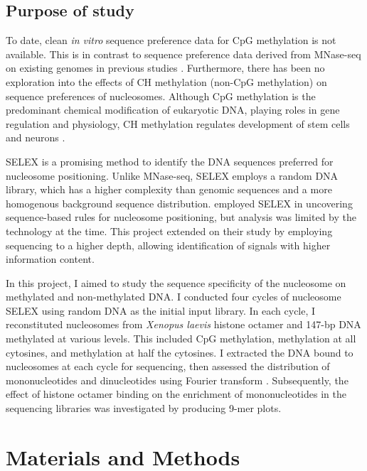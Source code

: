 \documentclass[parskip=full, numbers=noenddot]{scrreprt}
\begin{document}
\subsection{Purpose of study}
\label{ssec:emsaselex_intro_why}

To date, clean \emph{in vitro} sequence preference data for CpG methylation is not available.  This is in contrast to sequence preference data derived from MNase-seq on existing genomes in previous studies \citep{struhl_determinants_2013, segal_genomic_2006, huff_dnmt1-independent_2014}.  Furthermore, there has been no exploration into the effects of CH methylation (non-CpG methylation) on sequence preferences of nucleosomes.  Although CpG methylation is the predominant chemical modification of eukaryotic DNA, playing roles in gene regulation and physiology, CH methylation regulates development of stem cells and neurons \citep{guo_distribution_2014}.

SELEX is a promising method to identify the DNA sequences preferred for nucleosome positioning.  Unlike MNase-seq, SELEX employs a random DNA library, which has a higher complexity than genomic sequences and a more homogenous background sequence distribution.  \citet{lowary_new_1998} employed SELEX in uncovering sequence-based rules for nucleosome positioning, but analysis was limited by the technology at the time.  This project extended on their study by employing sequencing to a higher depth, allowing identification of signals with higher information content.

In this project, I aimed to study the sequence specificity of the nucleosome on methylated and non-methylated DNA.  I conducted four cycles of nucleosome SELEX using random DNA as the initial input library.  In each cycle, I reconstituted nucleosomes from \emph{Xenopus laevis} histone octamer and 147-bp DNA \citep{dyer_reconstitution_2003} methylated at various levels.  This included CpG methylation, methylation at all cytosines, and methylation at half the cytosines.  I extracted the DNA bound to nucleosomes at each cycle for sequencing, then assessed the distribution of mononucleotides and dinucleotides using Fourier transform \citep{lowary_new_1998, zhu_interaction_2018}.  Subsequently, the effect of histone octamer binding on the enrichment of mononucleotides in the sequencing libraries was investigated by producing 9-mer plots.

\section{Materials and Methods}
\label{sec:emsaselex_methods}
\end{document}
